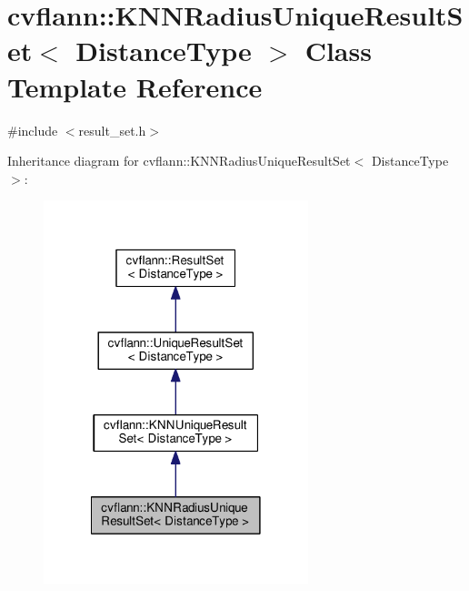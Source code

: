 \hypertarget{classcvflann_1_1KNNRadiusUniqueResultSet}{\section{cvflann\-:\-:K\-N\-N\-Radius\-Unique\-Result\-Set$<$ Distance\-Type $>$ Class Template Reference}
\label{classcvflann_1_1KNNRadiusUniqueResultSet}
}


{\ttfamily \#include $<$result\-\_\-set.\-h$>$}



Inheritance diagram for cvflann\-:\-:K\-N\-N\-Radius\-Unique\-Result\-Set$<$ Distance\-Type $>$\-:\nopagebreak
\begin{figure}[H]
\begin{center}
\leavevmode
\includegraphics[width=218pt]{classcvflann_1_1KNNRadiusUniqueResultSet__inherit__graph}
\end{center}
\end{figure}


